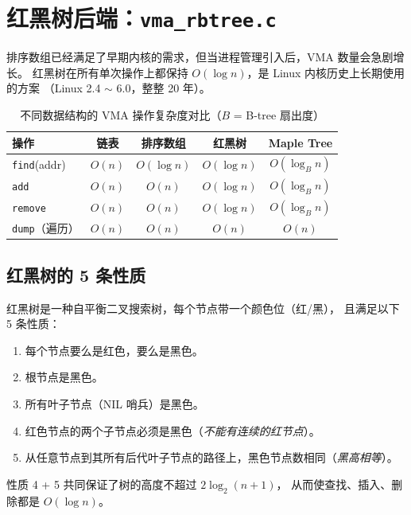 \section{红黑树后端：\texttt{vma\_rbtree.c}}
\label{sec:vma-rbtree}

排序数组已经满足了早期内核的需求，但当进程管理引入后，VMA 数量会急剧增长。
红黑树在所有单次操作上都保持 $O(\log n)$，是 Linux 内核历史上长期使用的方案
（Linux 2.4 $\sim$ 6.0，整整 20 年）。

\begin{table}[H]
\centering
\begin{tabular}{lcccc}
\toprule
\textbf{操作} & \textbf{链表} & \textbf{排序数组} & \textbf{红黑树} & \textbf{Maple Tree} \\
\midrule
\texttt{find}(addr)   & $O(n)$      & $O(\log n)$  & $O(\log n)$  & $O(\log_B n)$ \\
\texttt{add}          & $O(n)$      & $O(n)$       & $O(\log n)$  & $O(\log_B n)$ \\
\texttt{remove}       & $O(n)$      & $O(n)$       & $O(\log n)$  & $O(\log_B n)$ \\
\texttt{dump}（遍历） & $O(n)$      & $O(n)$       & $O(n)$       & $O(n)$        \\
\bottomrule
\end{tabular}
\caption{不同数据结构的 VMA 操作复杂度对比（$B$ = B-tree 扇出度）}
\label{tab:vma-complexity}
\end{table}

\subsection{红黑树的 5 条性质}

红黑树是一种自平衡二叉搜索树，每个节点带一个颜色位（红/黑），
且满足以下 5 条性质：

\begin{enumerate}
  \item 每个节点要么是红色，要么是黑色。
  \item 根节点是黑色。
  \item 所有叶子节点（NIL 哨兵）是黑色。
  \item 红色节点的两个子节点必须是黑色（\emph{不能有连续的红节点}）。
  \item 从任意节点到其所有后代叶子节点的路径上，黑色节点数相同（\emph{黑高相等}）。
\end{enumerate}

性质 4 + 5 共同保证了树的高度不超过 $2\log_2(n+1)$，
从而使查找、插入、删除都是 $O(\log n)$。

